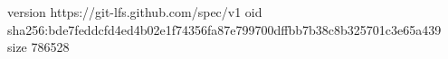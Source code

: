 version https://git-lfs.github.com/spec/v1
oid sha256:bde7feddcfd4ed4b02e1f74356fa87e799700dffbb7b38c8b325701c3e65a439
size 786528
